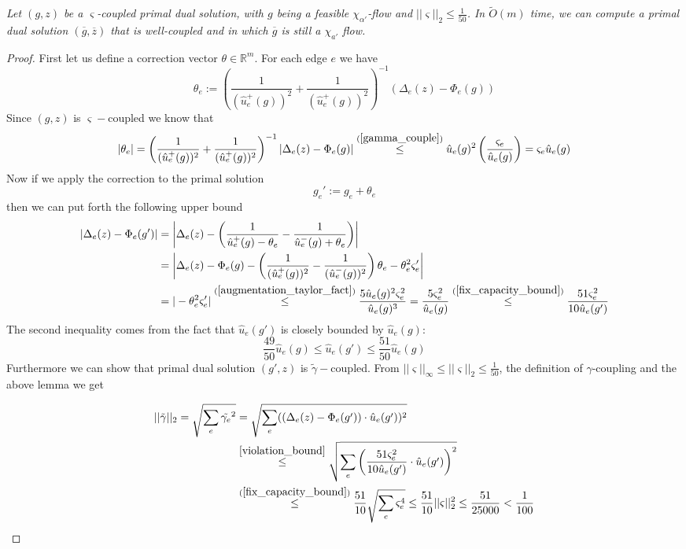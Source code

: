 \begin{lemma} \label{fixing_lemma}
\textit{Let $(g,z)$ be a $\varsigma$-coupled primal dual solution, with $g$ being a feasible $\chi_{\alpha'}$-flow and $||\varsigma||_2 \le\frac{1}{50}$. In $\tilde  O(m)$ time, we can compute a primal dual solution $(\overline{g}, \overline{z})$ that is well-coupled and in which $\overline{g}$ is still a $\chi_{a'}$ flow.}
\end{lemma}
\begin{proof}
First let us define a correction vector $\theta\in\mathbb{R}^m$. For each edge $e$ we have
\begin{equation} \label{correction}
\theta_e := \left(\frac{1}{(\hat u_e^+(g))^2}+\frac{1}{(\hat u_e^+(g))^2} \right)^{-1}(\Delta_e(z)-\Phi_e(g))
\end{equation}
Since $(g, z)$ is $\varsigma-$coupled we know that
\[
|\theta_e|
= \left(\frac{1}{(\hat u_e^+(g))^2}+\frac{1}{(\hat u_e^+(g))^2} \right)^{-1}|\Delta_e(z)-\Phi_e(g)|
\stackrel{(\ref{gamma_couple})}{\le} \hat u_e(g)^2\left(\frac{\varsigma_e}{\hat u_e(g)}\right) = \varsigma_e\hat u_e(g)
\]
Now if we apply the correction to the primal solution
\[ g_e' := g_e + \theta_e \]
then we can put forth the following upper bound
\[
\begin{split}
|\Delta_e(z)-\Phi_e(g')|
&= \left|\Delta_e(z)-\left(\frac{1}{\hat u_e^+(g)-\theta_e}-\frac{1}{\hat u_e^-(g)+\theta_e}\right)\right| \\
&= \left|\Delta_e(z)-\Phi_e(g)-\left(\frac{1}{(\hat u_e^+(g))^2}-\frac{1}{(\hat u_e^-(g))^2}\right)\theta_e-\theta_e^2\varsigma_e'\right| \\
&= |-\theta_e^2\varsigma_e'|
\stackrel{(\ref{augmentation_taylor_fact})}{\le} \frac{5\hat u_e(g)^2\varsigma_e^2}{\hat u_e(g)^3}
= \frac{5\varsigma_e^2}{\hat u_e(g)}
\stackrel{(\ref{fix_capacity_bound})}{\le} \frac{51\varsigma_e^2}{10\hat u_e(g')}
\end{split}
\]
The second inequality comes from the fact that $\hat u_e(g')$ is closely bounded by $\hat u_e(g)$:
\begin{equation}
\label{fix_capacity_bound}
\frac{49}{50}\hat u_e(g) \le \hat u_e(g') \le \frac{51}{50}\hat u_e(g)
\end{equation}
Furthermore we can show that primal dual solution $(g', z)$ is $\tilde{\gamma}-$coupled.
From $||\varsigma||_\infty \le ||\varsigma||_2 \le \frac{1}{50}$, the definition of $\gamma$-coupling and the above lemma we get

\begin{equation}
\begin{split}
||\tilde{\gamma}||_2 
= \sqrt{\sum_e\tilde{\gamma_e}^2}
&= \sqrt{\sum_e((\Delta_e(z)-\Phi_e(g'))\cdot\hat u_e(g'))^2}\\
&\stackrel{\ref{violation_bound}}{\le} \sqrt{\sum_e\left(\frac{51\varsigma_e^2}{10\hat u_e(g')}\cdot\hat u_e(g')\right)^2}\\
&\stackrel{(\ref{fix_capacity_bound})}{\le} \frac{51}{10}\sqrt{\sum_e\varsigma_e^4}
\le \frac{51}{10}||\varsigma||_2^2
\le \frac{51}{25000} < \frac{1}{100}
\end{split}
\end{equation}


\end{proof}
